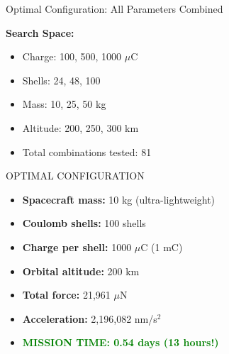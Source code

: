 \documentclass[11pt]{beamer}
\begin{document}
\begin{frame}{Optimal Configuration: All Parameters Combined}

\textbf{Search Space:}
\begin{itemize}
\item Charge: 100, 500, 1000 $\mu$C
\item Shells: 24, 48, 100
\item Mass: 10, 25, 50 kg
\item Altitude: 200, 250, 300 km
\item Total combinations tested: 81
\end{itemize}

\vspace{0.3cm}

\begin{block}{OPTIMAL CONFIGURATION}
\begin{itemize}
\item \textbf{Spacecraft mass:} 10 kg (ultra-lightweight)
\item \textbf{Coulomb shells:} 100 shells
\item \textbf{Charge per shell:} 1000 $\mu$C (1 mC)
\item \textbf{Orbital altitude:} 200 km
\item \textbf{Total force:} 21,961 $\mu$N
\item \textbf{Acceleration:} 2,196,082 nm/s$^2$
\item \textcolor{green}{\textbf{MISSION TIME: 0.54 days (13 hours!)}}
\end{itemize}
\end{block}

\end{frame}
\end{document}
